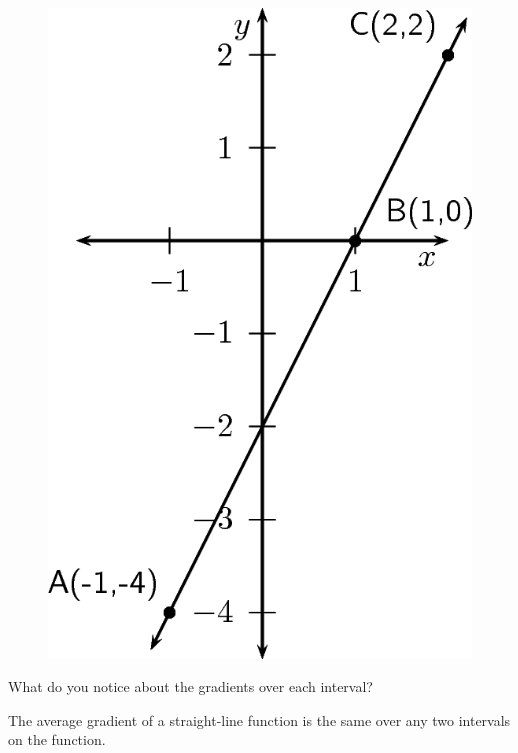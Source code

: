     \par
    \setcounter{subfigure}{0}
	\begin{figure}[H] %
    \begin{center}
    \label{m39213*id190171!!!underscore!!!media}\label{m39213*id190171!!!underscore!!!printimage}\includegraphics{col11306.imgs/m39213_MG10C12_001.png} %
      \vspace{2pt}
    \vspace{.1in}
    \end{center}
 \end{figure}       
      \par 
      \label{m39213*id190178}What do you notice about the gradients over each interval?
 \par 
      \label{m39213*id190187}The average gradient of a straight-line function is the same over any two intervals on the function.\par 
    \label{m39213**end}
